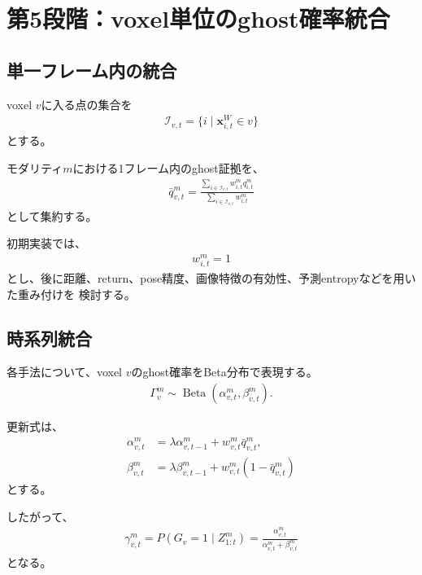 \documentclass[uplatex,a4paper,11pt]{jsarticle}
\begin{document}
\section{第5段階：voxel単位のghost確率統合}

\subsection{単一フレーム内の統合}

voxel $v$に入る点の集合を
\begin{align}
  \mathcal{I}_{v,t}
  =
  \{
    i
    \mid
    \bm{x}_{i,t}^{W}\in v
  \}
\end{align}
とする。

モダリティ$m$における1フレーム内のghost証拠を、
\begin{align}
  \bar{q}_{v,t}^{m}
  =
  \frac{
    \sum_{i\in\mathcal{I}_{v,t}}
    w_{i,t}^{m}
    q_{i,t}^{m}
  }{
    \sum_{i\in\mathcal{I}_{v,t}}
    w_{i,t}^{m}
  }
\end{align}
として集約する。

初期実装では、
\begin{align}
  w_{i,t}^{m}=1
\end{align}
とし、後に距離、return、pose精度、画像特徴の有効性、予測entropyなどを用いた重み付けを
検討する。

\subsection{時系列統合}

各手法について、voxel $v$のghost確率をBeta分布で表現する。
\begin{align}
  \Gamma_v^{m}
  \sim
  \operatorname{Beta}
  \left(
    \alpha_{v,t}^{m},
    \beta_{v,t}^{m}
  \right).
\end{align}

更新式は、
\begin{align}
  \alpha_{v,t}^{m}
  &=
  \lambda
  \alpha_{v,t-1}^{m}
  +
  w_{v,t}^{m}
  \bar{q}_{v,t}^{m},
  \\
  \beta_{v,t}^{m}
  &=
  \lambda
  \beta_{v,t-1}^{m}
  +
  w_{v,t}^{m}
  \left(
    1-\bar{q}_{v,t}^{m}
  \right)
\end{align}
とする。

したがって、
\begin{align}
  \gamma_{v,t}^{m}
  =
  P
  \left(
    G_v=1
    \mid
    Z_{1:t}^{m}
  \right)
  =
  \frac{
    \alpha_{v,t}^{m}
  }{
    \alpha_{v,t}^{m}
    +
    \beta_{v,t}^{m}
  }
\end{align}
となる。
\end{document}
